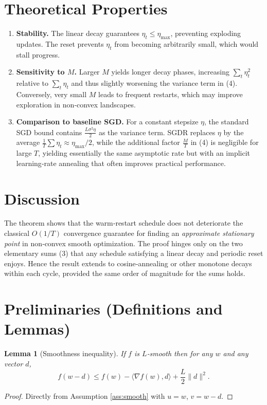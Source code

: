 \documentclass{article}
\newtheorem{lemma}{Lemma}
\begin{document}
\section*{Theoretical Properties}
\begin{enumerate}[label=\arabic*.]
    \item \textbf{Stability.} The linear decay guarantees $\eta_t\le\eta_{\max}$, preventing exploding updates. The reset prevents $\eta_t$ from becoming arbitrarily small, which would stall progress.
    \item \textbf{Sensitivity to $M$.} Larger $M$ yields longer decay phases, increasing $\sum_{t}\eta_t^{2}$ relative to $\sum_{t}\eta_t$ and thus slightly worsening the variance term in (4). Conversely, very small $M$ leads to frequent restarts, which may improve exploration in non‑convex landscapes.
    \item \textbf{Comparison to baseline SGD.} For a constant stepsize $\eta$, the standard SGD bound contains $\frac{L\sigma^{2}\eta}{2}$ as the variance term. SGDR replaces $\eta$ by the average $\frac{1}{T}\sum\eta_t\approx\eta_{\max}/2$, while the additional factor $\frac{M}{T}$ in (4) is negligible for large $T$, yielding essentially the same asymptotic rate but with an implicit learning‑rate annealing that often improves practical performance.
\end{enumerate}

\section*{Discussion}
The theorem shows that the warm‑restart schedule does not deteriorate the classical $O(1/T)$ convergence guarantee for finding an \emph{approximate stationary point} in non‑convex smooth optimization. The proof hinges only on the two elementary sums (3) that any schedule satisfying a linear decay and periodic reset enjoys. Hence the result extends to cosine‑annealing or other monotone decays within each cycle, provided the same order of magnitude for the sums holds.

\section*{Preliminaries (Definitions and Lemmas)}
\begin{lemma}[Smoothness inequality]\label{lem:smooth}
If $f$ is $L$‑smooth then for any $w$ and any vector $d$,
\[
    f(w-d)\le f(w)-\langle\nabla f(w),d\rangle+\frac{L}{2}\|d\|^{2}.
\tag{5}
\]
\end{lemma}
\begin{proof}
Directly from Assumption \ref{ass:smooth} with $u=w$, $v=w-d$.
\end{proof}
\end{document}

